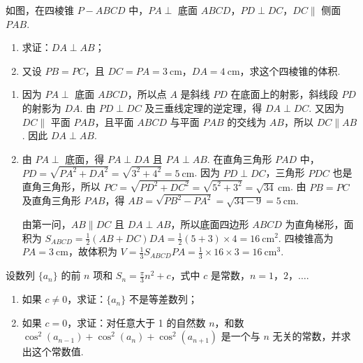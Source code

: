 \begin{problem}
如图，在四棱锥 \(P - ABCD\) 中，\(PA \perp\) 底面 \(ABCD\)，\(PD \perp DC\)，\(DC \parallel\) 侧面 \(PAB\).

\begin{enumerate}
\item 求证：\(DA \perp AB\)；
\item 又设 \(PB = PC\)，且 \(DC = PA = 3\mathrm{~cm}\)，\(DA = 4\mathrm{~cm}\)，求这个四棱锥的体积.
\end{enumerate}

\end{problem}

\begin{solution}
\begin{enumerate}
\item 因为 \(PA\perp\) 底面 \(ABCD\)，所以点 \(A\) 是斜线 \(PD\) 在底面上的射影，斜线段 \(PD\) 的射影为 \(DA\). 由 \(PD\perp DC\) 及三垂线定理的逆定理，得 \(DA\perp DC\). 又因为 \(DC\parallel\) 平面 \(PAB\)，且平面 \(ABCD\) 与平面 \(PAB\) 的交线为 \(AB\)，所以 \(DC\parallel AB\). 因此 \(DA\perp AB\).
\item 由 \(PA\perp\) 底面，得 \(PA\perp DA\) 且 \(PA\perp AB\). 在直角三角形 \(PAD\) 中，\(PD=\sqrt{PA^2+DA^2}=\sqrt{3^2+4^2}=5\mathrm{~cm}\). 因为 \(PD\perp DC\)，三角形 \(PDC\) 也是直角三角形，所以 \(PC=\sqrt{PD^2+DC^2}=\sqrt{5^2+3^2}=\sqrt{34}\mathrm{~cm}\). 由 \(PB=PC\) 及直角三角形 \(PAB\)，得 \(AB=\sqrt{PB^2-PA^2}=\sqrt{34-9}=5\mathrm{~cm}\).

由第一问，\(AB\parallel DC\) 且 \(DA\perp AB\)，所以底面四边形 \(ABCD\) 为直角梯形，面积为 \(S_{ABCD}=\frac12(AB+DC)DA=\frac12(5+3)\times4=16\mathrm{~cm}^2\). 四棱锥高为 \(PA=3\mathrm{~cm}\)，故体积为 \(V=\frac13S_{ABCD}PA=\frac13\times16\times3=16\mathrm{~cm}^3\).
\end{enumerate}
\end{solution}

\begin{problem}
设数列 \(\{a_n\}\) 的前 \(n\) 项和 \(S_n = \frac{\pi}{3}n^2 + c\)，式中 \(c\) 是常数，\(n = 1\)，\(2\)，\(\dots\).
\begin{enumerate}
\item 如果 \(c \neq 0\)，求证：\(\{a_n\}\) 不是等差数列；
\item 如果 \(c = 0\)，求证：对任意大于 1 的自然数 \(n\)，和数 \(\cos^2(a_{n-1}) + \cos^2(a_n) + \cos^2(a_{n+1})\) 是一个与 \(n\) 无关的常数，并求出这个常数值.
\end{enumerate}
\end{problem}

